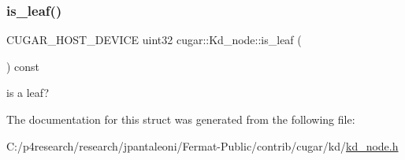 \subsubsection{\texorpdfstring{is\+\_\+leaf()}{is\_leaf()}}
{\footnotesize\ttfamily C\+U\+G\+A\+R\+\_\+\+H\+O\+S\+T\+\_\+\+D\+E\+V\+I\+CE uint32 cugar\+::\+Kd\+\_\+node\+::is\+\_\+leaf (\begin{DoxyParamCaption}{ }\end{DoxyParamCaption}) const\hspace{0.3cm}{\ttfamily [inline]}}

is a leaf? 

The documentation for this struct was generated from the following file\+:\begin{DoxyCompactItemize}
\item 
C\+:/p4research/research/jpantaleoni/\+Fermat-\/\+Public/contrib/cugar/kd/\hyperlink{kd__node_8h}{kd\+\_\+node.\+h}\end{DoxyCompactItemize}
